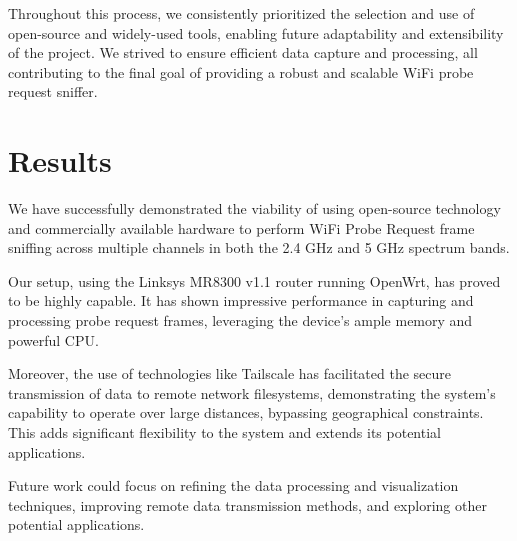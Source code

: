 \documentclass{article}
\begin{document}
Throughout this process, we consistently prioritized the selection and use of open-source and widely-used tools, enabling future adaptability and extensibility of the project. We strived to ensure efficient data capture and processing, all contributing to the final goal of providing a robust and scalable WiFi probe request sniffer.

\section{Results}
 
We have successfully demonstrated the viability of using open-source technology and commercially available hardware to perform WiFi Probe Request frame sniffing across multiple channels in both the 2.4 GHz and 5 GHz spectrum bands.

Our setup, using the Linksys MR8300 v1.1 router running OpenWrt, has proved to be highly capable. It has shown impressive performance in capturing and processing probe request frames, leveraging the device's ample memory and powerful CPU.

Moreover, the use of technologies like Tailscale has facilitated the secure transmission of data to remote network filesystems, demonstrating the system's capability to operate over large distances, bypassing geographical constraints. This adds significant flexibility to the system and extends its potential applications.

Future work could focus on refining the data processing and visualization techniques, improving remote data transmission methods, and exploring other potential applications.


\end{document}
